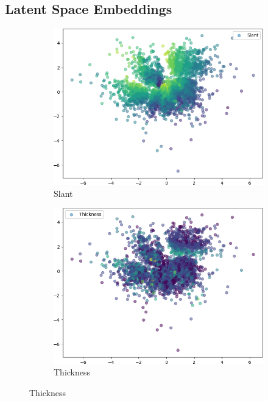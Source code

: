 \documentclass{beamer}
\begin{document}
\subsection{Latent Space Embeddings}
\begin{frame}
\begin{figure}
\centering
\begin{subfigure}{.32\textwidth}
\includegraphics[width=\textwidth]{images/latent_spaces/mnist/vae/embeddings_mu_0.png}
\caption{Slant}
\end{subfigure}
\hfill
\begin{subfigure}{.32\textwidth}
\includegraphics[width=\textwidth]{images/latent_spaces/mnist/vae/embeddings_mu_1.png}
\caption{Thickness}
\end{subfigure}

\end{figure}
\end{frame}
\end{document}
